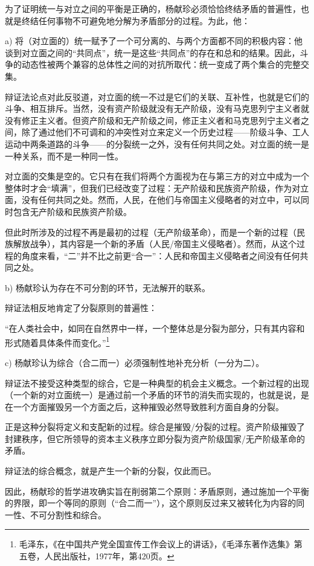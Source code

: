 \documentclass[fontset=fandol, a4paper, 12pt, twoside]{ctexart}
\renewenvironment{quote}
  {\list{}{\rightmargin=0cm \leftmargin=2em}%
   \item\relax\small\kaishu\color{black}}
  {\endlist}
\begin{document}
为了证明统一与对立之间的平衡是正确的，杨献珍必须恰恰终结矛盾的普遍性，也就是终结任何事物不可避免地分解为矛盾部分的过程。为此，他：

a) 将（对立面的）统一赋予了一个可分离的、与两个方面都不同的积极内容：他谈到对立面之间的“共同点”，统一是这些“共同点”的存在和总和的结果。因此，斗争的动态性被两个兼容的总体性之间的对抗所取代：统一变成了两个集合的完整交集。

辩证法论点对此反驳道，对立面的统一不过是它们的关联、互补性，也就是它们的斗争、相互排斥。当然，没有资产阶级就没有无产阶级，没有马克思列宁主义者就没有修正主义者。但资产阶级和无产阶级之间，修正主义者和马克思列宁主义者之间，除了通过他们不可调和的冲突性对立来定义一个历史过程——阶级斗争、工人运动中两条道路的斗争——的分裂统一之外，没有任何共同之处。对立面的统一是一种关系，而不是一种同一性。

对立面的交集是空的。它只有在我们将两个方面视为在与第三方的对立中成为一个整体时才会“填满”，但我们已经改变了过程：无产阶级和民族资产阶级，作为对立面，没有任何共同之处。然而，人民，在他们与帝国主义侵略者的对立中，可以同时包含无产阶级和民族资产阶级。

但此时所涉及的过程不再是最初的过程（无产阶级革命），而是一个新的过程（民族解放战争），其内容是一个新的矛盾（人民/帝国主义侵略者）。然而，从这个过程的角度来看，“二”并不比之前更“合一”：人民和帝国主义侵略者之间没有任何共同之处。

b) 杨献珍认为存在不可分割的环节，无法解开的联系。

辩证法相反地肯定了分裂原则的普遍性：

\begin{quote}
“在人类社会中，如同在自然界中一样，一个整体总是分裂为部分，只有其内容和形式随着具体条件而变化。”\footnote{毛泽东，《在中国共产党全国宣传工作会议上的讲话》，《毛泽东著作选集》第五卷，人民出版社，1977年，第420页。}
\end{quote}

c) 杨献珍认为综合（合二而一）必须强制性地补充分析（一分为二）。

辩证法不接受这种类型的综合，它是一种典型的机会主义概念。一个新过程的出现（一个新的对立面统一）是通过前一个矛盾的环节的消失而实现的，也就是说，是在一个方面摧毁另一个方面之后，这种摧毁必然导致胜利方面自身的分裂。

正是这种分裂将定义和支配新的过程。综合是摧毁/分裂的过程。资产阶级摧毁了封建秩序，但它所领导的资本主义秩序立即分裂为资产阶级国家/无产阶级革命的矛盾。

辩证法的综合概念，就是产生一个新的分裂，仅此而已。

因此，杨献珍的哲学进攻确实旨在削弱第二个原则：矛盾原则，通过施加一个平衡的界限，即一个等同的原则（“合二而一”），这个原则反过来又被转化为内容的同一性、不可分割性和综合。
\end{document}
